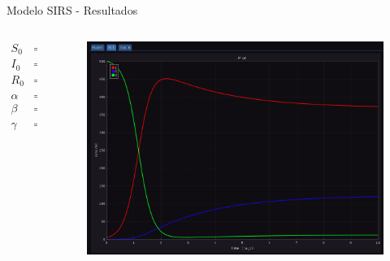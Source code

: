 \begin{frame}{Modelo SIRS - Resultados}
    \begin{columns}
        \begin{column}{.2\textwidth}
            \[
            \begin{array}{llr}
                S_0 & = & 500\\
                I_0 & = & 5\\
                R_0 & = & 0\\
                \alpha & = & 0.1\\
                \beta & = & 0.008\\
                \gamma & = & 0.3\\
                \end{array}
            \]
        \end{column}
        \begin{column}{.8\textwidth}
            \begin{figure}
                \centering
                \includegraphics[height=\textheight]{contents/imgs/modelos/resultado-sirs.png}
            \end{figure}
        \end{column}
    \end{columns}
\end{frame}
